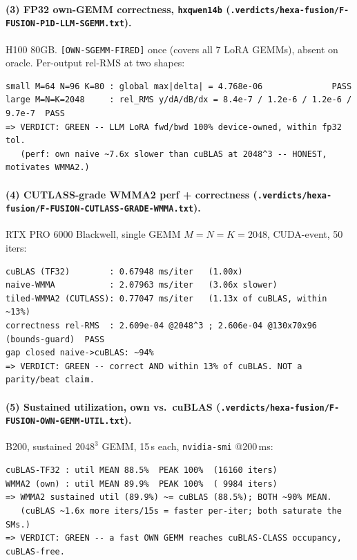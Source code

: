 \documentclass[11pt,a4paper]{article}
\newcommand{\vd}[1]{\texttt{.verdicts/hexa-fusion/#1.txt}}
\begin{document}
\paragraph{(3) FP32 own-GEMM correctness, \texttt{hxqwen14b}
(\vd{F-FUSION-P1D-LLM-SGEMM}).}
H100 80GB. \texttt{[OWN-SGEMM-FIRED]} once (covers all 7 LoRA GEMMs), absent on
oracle. Per-output rel-RMS at two shapes:
\begin{lstlisting}[basicstyle=\ttfamily\footnotesize,frame=single,xleftmargin=0pt]
small M=64 N=96 K=80 : global max|delta| = 4.768e-06              PASS
large M=N=K=2048     : rel_RMS y/dA/dB/dx = 8.4e-7 / 1.2e-6 / 1.2e-6 / 9.7e-7  PASS
=> VERDICT: GREEN -- LLM LoRA fwd/bwd 100% device-owned, within fp32 tol.
   (perf: own naive ~7.6x slower than cuBLAS at 2048^3 -- HONEST, motivates WMMA2.)
\end{lstlisting}

\paragraph{(4) CUTLASS-grade WMMA2 perf + correctness
(\vd{F-FUSION-CUTLASS-GRADE-WMMA}).}
RTX PRO 6000 Blackwell, single GEMM $M\!=\!N\!=\!K\!=\!2048$, CUDA-event, 50 iters:
\begin{lstlisting}[basicstyle=\ttfamily\footnotesize,frame=single,xleftmargin=0pt]
cuBLAS (TF32)        : 0.67948 ms/iter   (1.00x)
naive-WMMA           : 2.07963 ms/iter   (3.06x slower)
tiled-WMMA2 (CUTLASS): 0.77047 ms/iter   (1.13x of cuBLAS, within ~13%)
correctness rel-RMS  : 2.609e-04 @2048^3 ; 2.606e-04 @130x70x96 (bounds-guard)  PASS
gap closed naive->cuBLAS: ~94%
=> VERDICT: GREEN -- correct AND within 13% of cuBLAS. NOT a parity/beat claim.
\end{lstlisting}

\paragraph{(5) Sustained utilization, own vs.\ cuBLAS
(\vd{F-FUSION-OWN-GEMM-UTIL}).}
B200, sustained $2048^3$ GEMM, 15\,s each, \texttt{nvidia-smi} @200\,ms:
\begin{lstlisting}[basicstyle=\ttfamily\footnotesize,frame=single,xleftmargin=0pt]
cuBLAS-TF32 : util MEAN 88.5%  PEAK 100%  (16160 iters)
WMMA2 (own) : util MEAN 89.9%  PEAK 100%  ( 9984 iters)
=> WMMA2 sustained util (89.9%) ~= cuBLAS (88.5%); BOTH ~90% MEAN.
   (cuBLAS ~1.6x more iters/15s = faster per-iter; both saturate the SMs.)
=> VERDICT: GREEN -- a fast OWN GEMM reaches cuBLAS-CLASS occupancy, cuBLAS-free.
\end{lstlisting}
\end{document}
